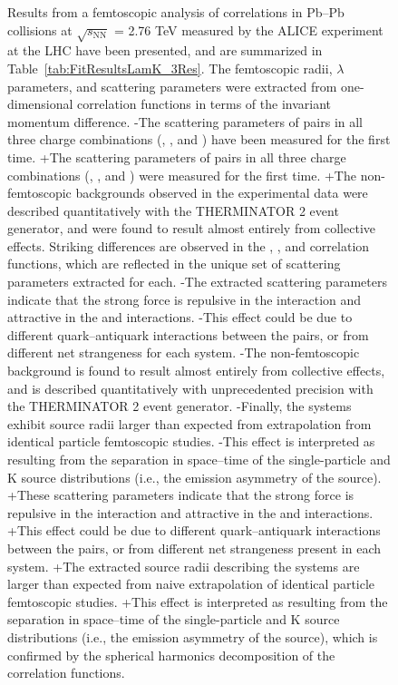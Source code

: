 \begin{table}[htbp]
\begin{figure}[h]
{ Results from a femtoscopic analysis of \LamK correlations in Pb--Pb collisions at $\sqrt{s_{\mathrm{NN}}}$ = 2.76 TeV measured by the ALICE experiment at the LHC have been presented, and are summarized in Table~\ref{tab:FitResultsLamK_3Res}.
 The femtoscopic radii, $\lambda$ parameters, and scattering parameters were extracted from one-dimensional correlation functions in terms of the invariant momentum difference.
-The scattering parameters of \LamK pairs in all three charge combinations (\LamKchP, \LamKchM, and \LamKs) have been measured for the first time.
+The scattering parameters of \LamK pairs in all three charge combinations (\LamKchP, \LamKchM, and \LamKs) were measured for the first time.
+The non-femtoscopic backgrounds observed in the experimental data were described quantitatively with the THERMINATOR 2 event generator, and were found to result almost entirely from collective effects.
 Striking differences are observed in the \LamKchP, \LamKchM, and \LamKs correlation functions, which are reflected in the unique set of scattering parameters extracted for each.
-The extracted scattering parameters indicate that the strong force is repulsive in the \LamKchP interaction and attractive in the \LamKchM and \LamKs interactions.
-This effect could be due to different quark--antiquark interactions between the pairs, or from different net strangeness for each system. 
-The non-femtoscopic background is found to result almost entirely from collective effects, and is described quantitatively with unprecedented precision with the THERMINATOR 2 event generator.
-Finally, the \LamK systems exhibit source radii larger than expected from extrapolation from identical particle femtoscopic studies.
-This effect is interpreted as resulting from the separation in space--time of the single-particle \Lam and K source distributions (i.e., the emission asymmetry of the source).
+These scattering parameters indicate that the strong force is repulsive in the \LamKchP interaction and attractive in the \LamKchM and \LamKs interactions.
+This effect could be due to different quark--antiquark interactions between the pairs, or from different net strangeness present in each system. 
+The extracted source radii describing the \LamK systems are larger than expected from naive extrapolation of identical particle femtoscopic studies.
+This effect is interpreted as resulting from the separation in space--time of the single-particle \Lam and K source distributions (i.e., the emission asymmetry of the source), which is confirmed by the spherical harmonics decomposition of the correlation functions.
 
}
\end{figure}
\end{table}
